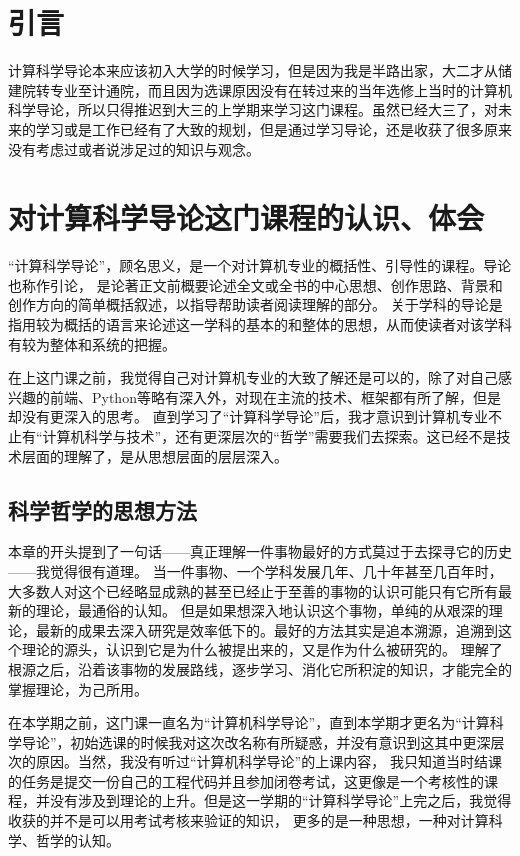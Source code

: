 \documentclass{article}
\begin{document}
\thispagestyle{empty}
\newpage
\setcounter{page}{1}
\section{引言}
计算科学导论\citep{book1}本来应该初入大学的时候学习，但是因为我是半路出家，大二才从储建院转专业至计通院，而且因为选课原因没有在转过来的当年选修上当时的计算机科学导论，所以只得推迟到大三的上学期来学习这门课程。虽然已经大三了，对未来的学习或是工作已经有了大致的规划，但是通过学习导论，还是收获了很多原来没有考虑过或者说涉足过的知识与观念。\par

\section{对计算科学导论这门课程的认识、体会}
“计算科学导论”，顾名思义，是一个对计算机专业的概括性、引导性的课程。导论也称作引论，
是论著正文前概要论述全文或全书的中心思想、创作思路、背景和创作方向的简单概括叙述，以指导帮助读者阅读理解的部分。
关于学科的导论是指用较为概括的语言来论述这一学科的基本的和整体的思想，从而使读者对该学科有较为整体和系统的把握。\par
在上这门课之前，我觉得自己对计算机专业的大致了解还是可以的，除了对自己感兴趣的前端、Python等略有深入外，对现在主流的技术、框架都有所了解，但是却没有更深入的思考。
直到学习了“计算科学导论”后，我才意识到计算机专业不止有“计算机科学与技术”，还有更深层次的“哲学”需要我们去探索。这已经不是技术层面的理解了，是从思想层面的层层深入。\par


\subsection{科学哲学的思想方法}
本章的开头提到了一句话——真正理解一件事物最好的方式莫过于去探寻它的历史——我觉得很有道理。
当一件事物、一个学科发展几年、几十年甚至几百年时，大多数人对这个已经略显成熟的甚至已经止于至善的事物的认识可能只有它所有最新的理论，最通俗的认知。
但是如果想深入地认识这个事物，单纯的从艰深的理论，最新的成果去深入研究是效率低下的。最好的方法其实是追本溯源，追溯到这个理论的源头，认识到它是为什么被提出来的，又是作为什么被研究的。
理解了根源之后，沿着该事物的发展路线，逐步学习、消化它所积淀的知识，才能完全的掌握理论，为己所用。\par

在本学期之前，这门课一直名为“计算机科学导论”，直到本学期才更名为“计算科学导论”，初始选课的时候我对这次改名称有所疑惑，并没有意识到这其中更深层次的原因。当然，我没有听过“计算机科学导论”的上课内容，
我只知道当时结课的任务是提交一份自己的工程代码并且参加闭卷考试，这更像是一个考核性的课程，并没有涉及到理论的上升。但是这一学期的“计算科学导论”上完之后，我觉得收获的并不是可以用考试考核来验证的知识，
更多的是一种思想，一种对计算科学、哲学的认知。\par
\end{document}
